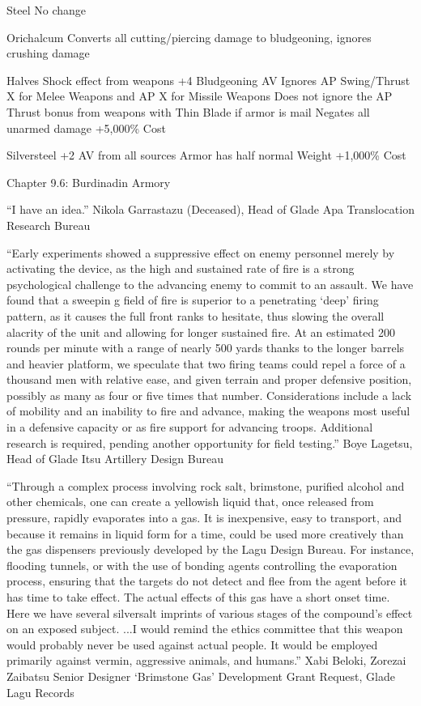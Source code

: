 \documentclass[oneside,11pt,english]{book}
\begin{document}
 

Steel 
No change 

 

Orichalcum 
Converts all cutting/piercing damage to bludgeoning, ignores crushing damage 


Halves Shock effect from weapons 
+4 Bludgeoning AV 
Ignores AP Swing/Thrust X for Melee Weapons and AP X for Missile Weapons 
Does not ignore the AP Thrust bonus from weapons with Thin Blade if armor is mail 
Negates all unarmed damage 
+5,000\% Cost 

 

Silversteel 
+2 AV from all sources 
Armor has half normal Weight 
+1,000\% Cost 
 
Chapter 9.6: Burdinadin Armory 

 

“I have an idea.” 
Nikola Garrastazu (Deceased), Head of Glade Apa Translocation Research Bureau 

 

“Early experiments showed a suppressive effect on enemy personnel merely by activating the device, as the high and sustained 
rate of fire is a strong psychological challenge to the advancing enemy to commit to an assault. We have found that a sweepin g 
field of fire is superior to a penetrating ‘deep’ firing pattern, as it causes the full front ranks to hesitate, thus slowing the overall 
alacrity of the unit and allowing for longer sustained fire. At an estimated 200 rounds per minute with a range of nearly 500 
yards thanks to the longer barrels and heavier platform, we speculate that two firing teams could repel a force of a thousand men 
with relative ease, and given terrain and proper defensive position, possibly as many as four or five times that number. 
Considerations include a lack of mobility and an inability to fire and advance, making the weapons most useful in a defensive 
capacity or as fire support for advancing troops. Additional research is required, pending another opportunity for field testing.” 
Boye Lagetsu, Head of Glade Itsu Artillery Design Bureau 

 

“Through a complex process involving rock salt, brimstone, purified alcohol and other chemicals, one can create a yellowish 
liquid that, once released from pressure, rapidly evaporates into a gas. It is inexpensive, easy to transport, and because it 
remains in liquid form for a time, could be used more creatively than the gas dispensers previously developed by the Lagu Design 
Bureau. For instance, flooding tunnels, or with the use of bonding agents controlling the evaporation process, ensuring that the 
targets do not detect and flee from the agent before it has time to take effect. The actual effects of this gas have a short onset time. 
Here we have several silversalt imprints of various stages of the compound’s effect on an exposed subject. 
...I would remind the ethics committee that this weapon would probably never be used against actual people. It would be 
employed primarily against vermin, aggressive animals, and humans.” 
Xabi Beloki, Zorezai Zaibatsu Senior Designer 
‘Brimstone Gas’ Development Grant Request, Glade Lagu Records 
\end{document}

